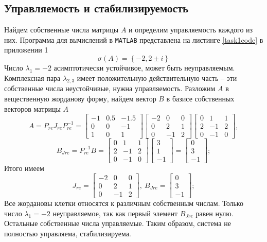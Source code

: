 \documentclass[a4paper, 12pt]{article}
\begin{document}
    \subsection{Управляемость и стабилизируемость}
    Найдем собственные числа матрицы $A$ и определим управляемость каждого из них. Программа для
    вычислений в \texttt{MATLAB} представлена на листинге \ref{task1code} в приложении 1
    $$
    \sigma\left( A \right)=\left\{-2,2\pm i\right\}
    $$
    Число $\lambda_1=-2$ асимптотически устойчивое, может быть неуправляемым. Комплексная пара $\lambda_{2,3}$
    имеет положительную действительную часть -- эти собственные числа неустойчивые, нужна управляемость.
    Разложим $A$ в вещественную жорданову форму, найдем вектор $B$ в базисе собственных векторов матрицы $A$
    $$
    A=P_{re}J_{re}P_{re}^{-1}=\begin{bmatrix}
    -1    &0.5   &-1.5\\
    0         &0   &-1\\
    1         &0    &1
    \end{bmatrix}\begin{bmatrix}
    -2     &0     &0\\
     0     &2     &1\\
     0    &-1     &2
    \end{bmatrix}\begin{bmatrix}
    0     &1     &1\\
     2    &-1     &2\\
     0    &-1     &0
    \end{bmatrix},
    $$
    $$
    B_{Jre}=P_{re}^{-1}B=\begin{bmatrix}
        0     &1     &1\\
         2    &-1     &2\\
         0    &-1     &0
        \end{bmatrix}\begin{bmatrix}
            3\\
            1\\
            -1
        \end{bmatrix}=\begin{bmatrix}
        0\\
     3\\
    -1
    \end{bmatrix};
    $$
    Итого имеем
    $$
    J_{re}=\begin{bmatrix}
        -2     &0     &0\\
         0     &2     &1\\
         0    &-1     &2
        \end{bmatrix},\ B_{Jre}=\begin{bmatrix}
            0\\
         3\\
        -1
        \end{bmatrix};
    $$
    Все жордановы клетки относятся к различным собственным числам. Только число $\lambda_1=-2$ неуправляемое,
    так как первый элемент $B_{Jre}$ равен нулю. Остальные собственные числа управляемые. Таким образом,
    система не полностью управляема, стабилизируема.
\end{document}

